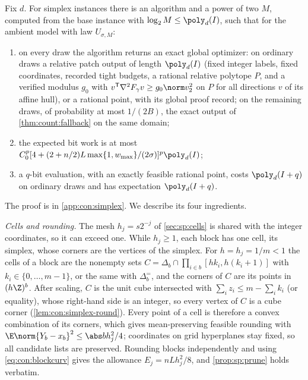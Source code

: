 \begin{theorem}\label{thm:con:simplex}
Fix $d$. For simplex instances there is an algorithm and a power of two $M$,
computed from the base instance with $\log_2M\le\poly_d(I)$, such that for
the ambient model with law $U_{\sigma,M}$:
\begin{enumerate}[label=(\roman*)]
\item on every draw the algorithm returns an exact global optimizer: on
ordinary draws a relative patch output of length $\poly_d(I)$ (fixed integer
labels, fixed coordinates, recorded tight budgets, a rational relative
polytope $P$, and a verified modulus $g_0$ with
$v^{\mathsf T}\nabla^2F_\gamma v\ge g_0\norm v_2^2$ on $P$ for all directions
$v$ of its affine hull), or a rational point, with its global proof record;
on the remaining draws, of probability at most $1/(2B)$, the exact output of
\cref{thm:count:fallback} on the same domain;
\item the expected bit work is at most
$C_0^p[4+(2+n/2)L\max\{1,w_{\max}\}/(2\sigma)]^p\poly_d(I)$;
\item a $q$-bit evaluation, with an exactly feasible rational point, costs
$\poly_d(I+q)$ on ordinary draws and has expectation $\poly_d(I+q)$.
\end{enumerate}
\end{theorem}

The proof is in \cref{app:con:simplex}. We describe its four ingredients.

\emph{Cells and rounding.} The mesh $h_j=s2^{-j}$ of \cref{sec:sp:cells} is
shared with the integer coordinates, so it can exceed one. While $h_j\ge1$,
each block has one cell, its simplex, whose corners are the vertices of the
simplex. For $h=h_j=1/m<1$ the cells of a block are the nonempty sets
$C=\Delta_b\cap\prod_{i\in b}[hk_i,h(k_i+1)]$ with $k_i\in\{0,\dots,m-1\}$,
or the same with $\Delta^=_b$, and the corners of $C$ are its points in
$(h\Z)^b$. After scaling, $C$ is the unit cube intersected with
$\sum_iz_i\le m-\sum_ik_i$ (or equality), whose right-hand side is an
integer, so every vertex of $C$ is a cube corner
(\cref{lem:con:simplex-round}). Every point of a cell is therefore a convex
combination of its corners, which gives mean-preserving feasible rounding
with $\E\norm{Y_b-x_b}^2\le\abs bh_j^2/4$; coordinates on grid hyperplanes
stay fixed, so all candidate lists are preserved. Rounding blocks
independently and using \eqref{eq:con:blockcurv} gives the allowance
$E_j=nLh_j^2/8$, and \cref{prop:sp:prune} holds verbatim.

